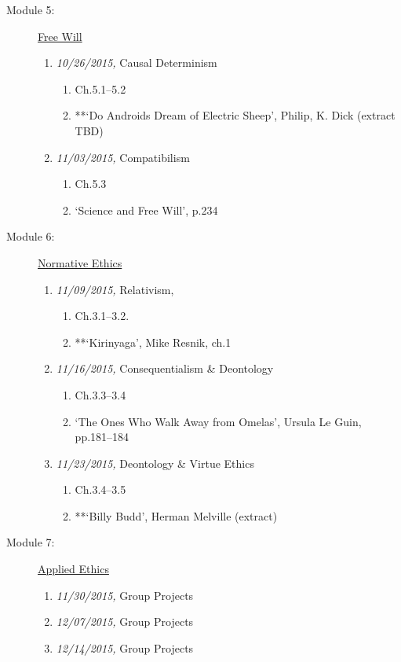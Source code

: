 \documentclass[article,oneside]{memoir}
\begin{document}
\begin{description}
\item[Module 5:] \href{http://scoconno.github.io/Teaching/Examined/FreeWill/}{Free Will}

\begin{enumerate}
\item \textit{10/26/2015,}  Causal Determinism
\begin{enumerate}
\item Ch.5.1--5.2
\item **`Do Androids Dream of Electric Sheep', Philip, K. Dick (extract TBD)
\end{enumerate}

\item \textit{11/03/2015,} Compatibilism
\begin{enumerate}
\item Ch.5.3
\item `Science and Free Will', p.234
\end{enumerate}

\end{enumerate}

\item[Module 6:] \href{http://scoconno.github.io/Teaching/Examined/Ethics/}{Normative Ethics}
\begin{enumerate}

\item \textit{11/09/2015,} Relativism, 
\begin{enumerate}
\item Ch.3.1--3.2.
\item **`Kirinyaga', Mike Resnik, ch.1
\end{enumerate}
\item \textit{11/16/2015,} Consequentialism \& Deontology 
\begin{enumerate}
\item Ch.3.3--3.4
\item  `The Ones Who Walk Away from Omelas', Ursula Le Guin, pp.181--184 
\end{enumerate}
\item \textit{11/23/2015,} Deontology \& Virtue Ethics
\begin{enumerate}
\item Ch.3.4--3.5
\item **`Billy Budd', Herman Melville (extract)
\end{enumerate}

\end{enumerate}

\item[Module 7:] \href{http://scoconno.github.io/Teaching/Examined/Applied/}{Applied Ethics}
\begin{enumerate}
\item \textit{11/30/2015,} Group Projects
\item \textit{12/07/2015,} Group Projects
\item \textit{12/14/2015,} Group Projects
\end{enumerate}

\end{description}
\end{document}
